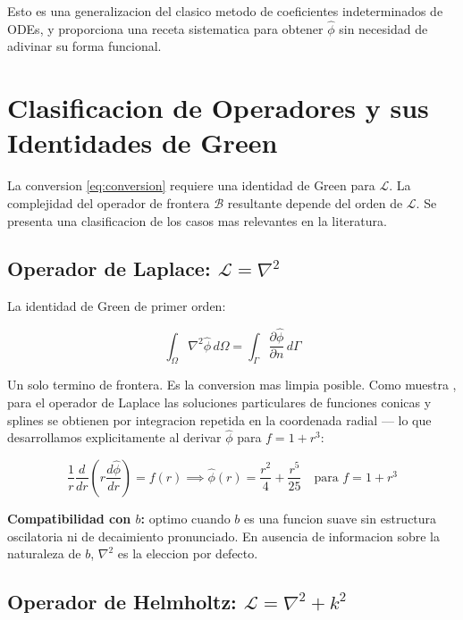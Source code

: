 \documentclass[12pt,a4paper]{article}
\begin{document}
Esto es una generalizacion del clasico metodo de coeficientes indeterminados
de ODEs, y proporciona una receta sistematica para obtener $\hat{\phi}$ sin
necesidad de adivinar su forma funcional.

\section{Clasificacion de Operadores y sus Identidades de Green}

La conversion \eqref{eq:conversion} requiere una identidad de Green para
$\mathcal{L}$. La complejidad del operador de frontera $\mathcal{B}$ resultante
depende del orden de $\mathcal{L}$. Se presenta una clasificacion de los casos
mas relevantes en la literatura.

\subsection{Operador de Laplace: $\mathcal{L} = \nabla^2$}

La identidad de Green de primer orden:

\begin{equation}
    \int_\Omega \nabla^2\hat{\phi}\, d\Omega
    = \int_\Gamma \frac{\partial\hat{\phi}}{\partial n}\, d\Gamma
\end{equation}

Un solo termino de frontera. Es la conversion mas limpia posible. Como muestra
\cite{cheng2000polyharmonic}, para el operador de Laplace las soluciones
particulares de funciones conicas y splines se obtienen por integracion
repetida en la coordenada radial --- lo que desarrollamos explicitamente al
derivar $\hat{\phi}$ para $f = 1 + r^3$:

\begin{equation}
    \frac{1}{r}\frac{d}{dr}\left(r\frac{d\hat{\phi}}{dr}\right) = f(r)
    \implies \hat{\phi}(r) = \frac{r^2}{4} + \frac{r^5}{25}
    \quad \text{para } f = 1 + r^3
\end{equation}

\textbf{Compatibilidad con $b$:} optimo cuando $b$ es una funcion suave sin
estructura oscilatoria ni de decaimiento pronunciado. En ausencia de
informacion sobre la naturaleza de $b$, $\nabla^2$ es la eleccion por
defecto.

\subsection{Operador de Helmholtz: $\mathcal{L} = \nabla^2 + k^2$}
\end{document}
